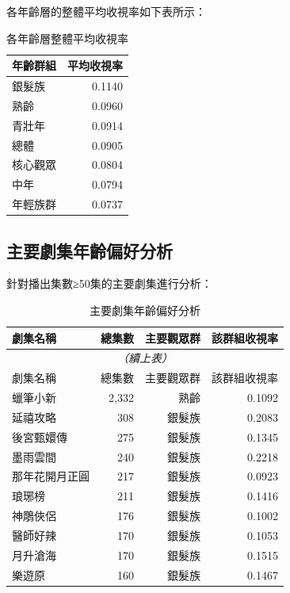 \documentclass[11pt,a4paper]{article}
\begin{document}
各年齡層的整體平均收視率如下表所示：

\begin{table}[H]
\centering
\caption{各年齡層整體平均收視率}
\begin{tabular}{lr}
\toprule
年齡群組 & 平均收視率 \\
\midrule
銀髮族 & 0.1140 \\
熟齡 & 0.0960 \\
青壯年 & 0.0914 \\
總體 & 0.0905 \\
核心觀眾 & 0.0804 \\
中年 & 0.0794 \\
年輕族群 & 0.0737 \\

\bottomrule
\end{tabular}
\end{table}

\subsection{主要劇集年齡偏好分析}

針對播出集數≥50集的主要劇集進行分析：

\begin{longtable}{lrrr}
\caption{主要劇集年齡偏好分析} \\
\toprule
劇集名稱 & 總集數 & 主要觀眾群 & 該群組收視率 \\
\midrule
\endfirsthead
\multicolumn{4}{c}{\textit{（續上表）}} \\
\toprule
劇集名稱 & 總集數 & 主要觀眾群 & 該群組收視率 \\
\midrule
\endhead
\bottomrule
\endfoot
蠟筆小新 & 2,332 & 熟齡 & 0.1092 \\
延禧攻略 & 308 & 銀髮族 & 0.2083 \\
後宮甄嬛傳 & 275 & 銀髮族 & 0.1345 \\
墨雨雲間 & 240 & 銀髮族 & 0.2218 \\
那年花開月正圓 & 217 & 銀髮族 & 0.0923 \\
琅琊榜 & 211 & 銀髮族 & 0.1416 \\
神鵰俠侶 & 176 & 銀髮族 & 0.1002 \\
醫師好辣 & 170 & 銀髮族 & 0.1053 \\
月升滄海 & 170 & 銀髮族 & 0.1515 \\
樂遊原 & 160 & 銀髮族 & 0.1467 \\

\end{longtable}
\end{document}
